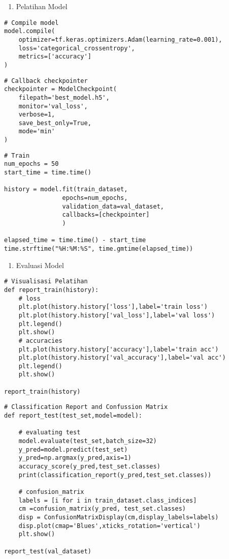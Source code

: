 \begin{enumerate}[label=\alph*., start=5]
    \item Pelatihan Model
\end{enumerate}

\begin{lstlisting}[style=customc]
# Compile model
model.compile(
    optimizer=tf.keras.optimizers.Adam(learning_rate=0.001),
    loss='categorical_crossentropy',
    metrics=['accuracy']
)
\end{lstlisting}

\begin{lstlisting}[style=customc]
# Callback checkpointer
checkpointer = ModelCheckpoint(
    filepath='best_model.h5',
    monitor='val_loss',
    verbose=1,
    save_best_only=True,
    mode='min'
)
\end{lstlisting}

\begin{lstlisting}[style=customc]
# Train
num_epochs = 50
start_time = time.time()

history = model.fit(train_dataset,
                epochs=num_epochs,
                validation_data=val_dataset,
                callbacks=[checkpointer]
                )

elapsed_time = time.time() - start_time
time.strftime("%H:%M:%S", time.gmtime(elapsed_time))
\end{lstlisting}

\begin{enumerate}[label=\alph*., start=6]
    \item Evaluasi Model
\end{enumerate}

\begin{lstlisting}[style=customc]
# Visualisasi Pelatihan
def report_train(history):
    # loss
    plt.plot(history.history['loss'],label='train loss')
    plt.plot(history.history['val_loss'],label='val loss')
    plt.legend()
    plt.show()
    # accuracies
    plt.plot(history.history['accuracy'],label='train acc')
    plt.plot(history.history['val_accuracy'],label='val acc')
    plt.legend()
    plt.show()

report_train(history)
\end{lstlisting}

\begin{lstlisting}[style=customc]
# Classification Report and Confussion Matrix
def report_test(test_set,model=model):

    # evaluating test
    model.evaluate(test_set,batch_size=32)
    y_pred=model.predict(test_set)
    y_pred=np.argmax(y_pred,axis=1)
    accuracy_score(y_pred,test_set.classes)
    print(classification_report(y_pred,test_set.classes))

    # confusion_matrix
    labels = [i for i in train_dataset.class_indices]
    cm =confusion_matrix(y_pred, test_set.classes)
    disp = ConfusionMatrixDisplay(cm,display_labels=labels)
    disp.plot(cmap='Blues',xticks_rotation='vertical')
    plt.show()

report_test(val_dataset)
\end{lstlisting}

